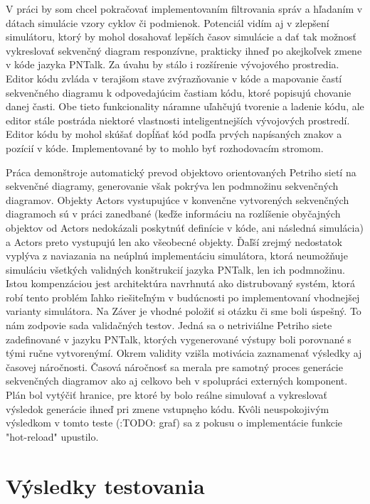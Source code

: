 V práci by som chcel pokračovať implementovaním filtrovania správ a hľadaním v dátach simulácie vzory cyklov či podmienok. Potenciál vidím aj v zlepšení simulátoru, ktorý by mohol dosahovať lepších časov simulácie a dať tak možnosť vykreslovať sekvenčný diagram responzívne, prakticky ihneď po akejkoľvek zmene v kóde jazyka PNTalk. Za úvahu by stálo i rozšírenie vývojového prostredia.
Editor kódu zvláda v terajšom stave zvýrazňovanie v kóde a mapovanie častí sekvenčného diagramu k odpovedajúcim častiam kódu, ktoré popisujú chovanie danej časti. Obe tieto funkcionality náramne uľahčujú tvorenie a ladenie kódu, ale editor stále postráda niektoré vlastnosti inteligentnejších vývojových prostredí. Editor kódu by mohol skúšať dopĺňať kód podľa prvých napísaných znakov a pozícií v kóde. Implementované by to mohlo byť rozhodovacím stromom. 

Práca demonštroje automatický prevod objektovo orientovaných Petriho sietí na sekvenčné diagramy, generovanie však pokrýva len podmnožinu sekvenčných diagramov. Objekty Actors vystupujúce v konvenčne vytvorených sekvenčných diagramoch sú v práci zanedbané (keďže informáciu na rozlíšenie obyčajných objektov od Actors nedokázali poskytnúť definície v kóde, ani následná simulácia) a Actors preto vystupujú len ako všeobecné objekty. Ďaľší zrejmý nedostatok vyplýva z naviazania na neúplnú implementáciu simulátora, ktorá neumožňuje simuláciu všetkých validných konštrukcií jazyka PNTalk, len ich podmnožinu. Istou kompenzáciou jest architektúra navrhnutá ako distrubovaný systém, ktorá robí tento problém ľahko riešiteľným v budúcnosti po implementovaní vhodnejšej varianty simulátora. Na Záver je vhodné položiť si otázku či sme boli úspešný.
To nám zodpovie sada validačných testov. Jedná sa o netriviálne Petriho siete zadefinované v jazyku PNTalk, ktorých vygenerované výstupy boli porovnané s tými ručne vytvorenýmí. Okrem validity vzišla motivácia zaznamenať výsledky aj časovej náročnosti. Časová náročnosť sa merala pre samotný proces generácie sekvenčných diagramov ako aj celkovo beh v spolupráci externých komponent. Plán bol vytýčiť hranice, pre ktoré by bolo reálne simulovať a vykreslovať výsledok generácie ihneď pri zmene vstupnęho kódu. Kvôli neuspokojivým výsledkom v tomto teste (:TODO: graf) sa z pokusu o implementácie funkcie "hot-reload" upustilo. 

\section{Výsledky testovania}




 

